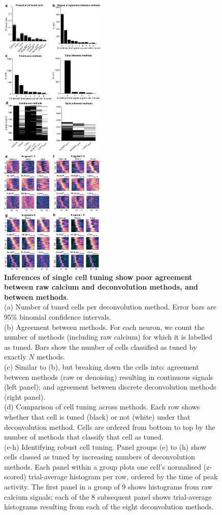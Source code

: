 \documentclass[a4paper,11pt]{article}
\begin{document}
\begin{figure}
	\centering
\includegraphics[width=0.45\textwidth]{composite_figs/fig5_tuned_cells.png}
\caption{\label{fig:tuned_cells} \textbf{Inferences of single cell tuning show poor agreement between raw calcium and deconvolution methods, and between methods}. \\
	(a) Number of tuned cells per deconvolution method. Error bars are 95\% binomial confidence intervals. \\ 
	(b) Agreement between methods. For each neuron, we count the number of methods (including raw calcium) for which it is labelled as tuned. Bars show the number of cells classified as tuned by exactly $N$ methods. \\
	(c) Similar to (b), but breaking down the cells into: agreement between methods (raw or denoising) resulting in continuous signals (left panel); and agreement between discrete deconvolution methods (right panel). \\ 
	(d) Comparison of cell tuning across methods. Each row shows whether that cell is tuned (black) or not (white) under that deconvolution method. Cells are ordered from bottom to top by the number of methods that classify that cell as tuned. \\
	(e-h) Identifying robust cell tuning. Panel groups (e) to (h) show cells classed as tuned by increasing numbers of deconvolution methods. Each panel within a group plots one cell's normalised (z-scored) trial-average histogram per row, ordered by the time of peak activity. The first panel in a group of 9 shows histograms from raw calcium signals; each of the 8 subsequent panel shows trial-average histograms resulting from each of the eight deconvolution methods.
}
\end{figure}
\end{document}
